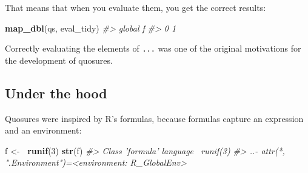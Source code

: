 \documentclass[]{book}
\newenvironment{Shaded}{\begin{snugshade}}{\end{snugshade}}
\newcommand{\CommentTok}[1]{\textcolor[rgb]{0.37,0.37,0.37}{\textit{#1}}}
\newcommand{\ControlFlowTok}[1]{\textcolor[rgb]{0.27,0.27,0.27}{\textbf{#1}}}
\newcommand{\DataTypeTok}[1]{\textcolor[rgb]{0.27,0.27,0.27}{#1}}
\newcommand{\DecValTok}[1]{\textcolor[rgb]{0.06,0.06,0.06}{#1}}
\newcommand{\ErrorTok}[1]{\textcolor[rgb]{0.14,0.14,0.14}{\textbf{#1}}}
\newcommand{\KeywordTok}[1]{\textcolor[rgb]{0.27,0.27,0.27}{\textbf{#1}}}
\newcommand{\NormalTok}[1]{#1}
\newcommand{\StringTok}[1]{\textcolor[rgb]{0.5,0.5,0.5}{#1}}
\begin{document}
\begin{Shaded}
\end{Shaded}

That means that when you evaluate them, you get the correct results:

\begin{Shaded}
\begin{Highlighting}[]
\KeywordTok{map_dbl}\NormalTok{(qs, eval_tidy)}
\CommentTok{#> global      f }
\CommentTok{#>      0      1}
\end{Highlighting}
\end{Shaded}

Correctly evaluating the elements of \texttt{...} was one of the original motivations for the development of quosures.

\hypertarget{quosure-impl}{%
\subsection{Under the hood}\label{quosure-impl}}


Quosures were inspired by R's formulas, because formulas capture an expression and an environment:

\begin{Shaded}
\begin{Highlighting}[]
\NormalTok{f <-}\StringTok{ }\ErrorTok{~}\KeywordTok{runif}\NormalTok{(}\DecValTok{3}\NormalTok{)}
\KeywordTok{str}\NormalTok{(f)}
\CommentTok{#> Class 'formula'  language ~runif(3)}
\CommentTok{#>   ..- attr(*, ".Environment")=<environment: R_GlobalEnv>}
\end{Highlighting}
\end{Shaded}
\end{document}
